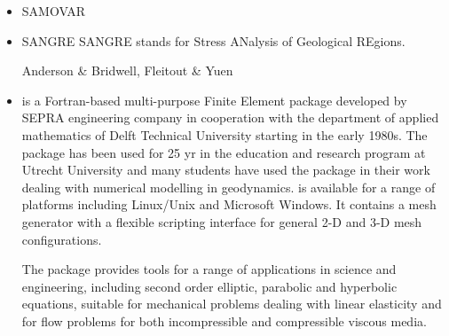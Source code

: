 \begin{itemize}
\item SAMOVAR

{\scriptsize
\noindent
\textcite{egat10}
}


\item {\codefont SANGRE} 
SANGRE stands for Stress ANalysis of Geological REgions.

\begin{scriptsize}
Anderson \& Bridwell\cite{anbr80},
Fleitout \& Yuen \cite{flyu84,flyu84b}
\end{scriptsize}

\item \sepran 
{}

\sepran \cite{sepr05} is a Fortran-based
multi-purpose Finite Element package developed by SEPRA engineering company in
cooperation with the department of applied mathematics of Delft Technical University
starting in the early 1980s. The package has been used for 25 yr in the education and
research program at Utrecht University and many students have used the package in
their work dealing with numerical modelling in geodynamics. \sepran is available for
a range of platforms including Linux/Unix and Microsoft Windows. It contains a mesh
generator with a flexible scripting interface for general 2-D and 3-D mesh configurations.

The package provides tools for a range of applications in science and engineering, including 
second order elliptic, parabolic and hyperbolic equations, suitable for mechanical 
problems dealing with linear elasticity and for flow problems for both incompressible
and compressible viscous media.


\end{itemize}
